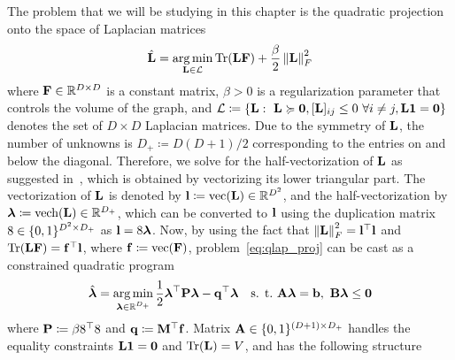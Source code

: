 The problem that we will be studying in this chapter is the quadratic projection onto the space of Laplacian matrices
\begin{equation}\label{eq:qlap_proj}
	\hat{\mathbf{L}} = \operatorname*{arg\,min}_{\mathbf{L}\in\mathcal{L}} \operatorname{Tr}(\mathbf{L}\mathbf{F}) + \frac{\beta}{2}\left\|\mathbf{L}\right\|_F^2
\end{equation}
where $\mathbf{F}\in\mathbb{R}^{D\times D}$ is a constant matrix, $\beta>0$ is a regularization parameter that controls the volume of the graph, and $\mathcal{L}\coloneqq\{\mathbf{L}:\ \mathbf{L}\succcurlyeq \mathbf{0}, [\mathbf{L}]_{ij}\leq 0\ \forall i\neq j, \mathbf{L}\mathbf{1}=\mathbf{0}\}$ denotes the set of $D\times D$ Laplacian matrices. Due to the symmetry of $\mathbf{L}$, the number of unknowns is $D_+\coloneqq D(D+1)/2$ corresponding to the entries on and below the diagonal. Therefore, we solve for the half-vectorization of $\mathbf{L}$ as suggested in~\cite{dong2016learning}, which is obtained by vectorizing its lower triangular part. The vectorization of $\mathbf{L}$ is denoted by $\mathbf{l}\coloneqq \text{vec}(\mathbf{L})\in\mathbb{R}^{D^2}$, and the half-vectorization by $\boldsymbol{\lambda}\coloneqq \text{vech}(\mathbf{L})\in\mathbb{R}^{D_+}$, which can be converted to $\mathbf{l}$ using the duplication matrix $8\in\{0,1\}^{D^2\times D_+}$ as $\mathbf{l} = 8\boldsymbol{\lambda}$. Now, by using the fact that $\left\|\mathbf{L}\right\|_F^2=\mathbf{l}^\top\mathbf{l}$ and $\operatorname{Tr} (\mathbf{L}\mathbf{F})=\mathbf{f}^\top\mathbf{l}$, where $\mathbf{f}\coloneqq \text{vec}(\mathbf{F})$, problem~\eqref{eq:qlap_proj} can be cast as a constrained quadratic program
\begin{equation}
	\label{eq:lap_est_qp} 
	\hat{\boldsymbol{\lambda}} = \operatorname*{arg\,min}_{\boldsymbol{\lambda}\in\mathbb{R}^{D_+}} \frac{1}{2}\boldsymbol{\lambda}^\top\mathbf{P}\boldsymbol{\lambda} - \mathbf{q}^\top\boldsymbol{\lambda}\quad \text{s. t.}\ \mathbf{A}\boldsymbol{\lambda} = \mathbf{b},\ \mathbf{B}\boldsymbol{\lambda} \leq \mathbf{0}
\end{equation}
where $\mathbf{P}\coloneqq \beta8^\top8$ and $\mathbf{q}\coloneqq \mathbf{M}^\top\mathbf{f}$. Matrix $\mathbf{A}\in\{0,1\}^{(D+1)\times D_+}$ handles the equality constraints $\mathbf{L}\mathbf{1}=\mathbf{0}$ and $\operatorname{Tr}(\mathbf{L})=V$, and has the following structure
\setlength\delimitershortfall{-2pt}
